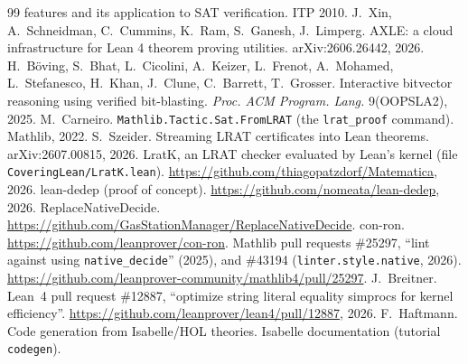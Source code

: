\documentclass[11pt]{article}
\begin{document}
\begin{thebibliography}{99}
  features and its application to SAT verification. ITP 2010.
 J.~Xin, A.~Schneidman, C.~Cummins, K.~Ram, S.~Ganesh, J.~Limperg. AXLE: a cloud
  infrastructure for Lean 4 theorem proving utilities. arXiv:2606.26442, 2026.
 H.~B\"oving, S.~Bhat, L.~Cicolini, A.~Keizer, L.~Frenot, A.~Mohamed,
  L.~Stefanesco, H.~Khan, J.~Clune, C.~Barrett, T.~Grosser. Interactive bitvector reasoning using
  verified bit-blasting. \emph{Proc. ACM Program. Lang.} 9(OOPSLA2), 2025.
 M.~Carneiro. \texttt{Mathlib.Tactic.Sat.FromLRAT} (the \texttt{lrat\_proof}
  command). Mathlib, 2022.
 S.~Szeider. Streaming LRAT certificates into Lean theorems. arXiv:2607.00815,
  2026.
 LratK, an LRAT checker evaluated by Lean's kernel (file \texttt{CoveringLean/LratK.lean}).
  \url{https://github.com/thiagopatzdorf/Matematica}, 2026.
 lean-dedep (proof of concept). \url{https://github.com/nomeata/lean-dedep}, 2026.
 ReplaceNativeDecide. \url{https://github.com/GasStationManager/ReplaceNativeDecide}.
 con-ron. \url{https://github.com/leanprover/con-ron}.
 Mathlib pull requests \#25297, ``lint against using \texttt{native\_decide}''
  (2025), and \#43194 (\texttt{linter.style.native}, 2026).
  \url{https://github.com/leanprover-community/mathlib4/pull/25297}.
 J.~Breitner. Lean~4 pull request \#12887, ``optimize string literal equality
  simprocs for kernel efficiency''. \url{https://github.com/leanprover/lean4/pull/12887}, 2026.
 F.~Haftmann. Code generation from Isabelle/HOL theories. Isabelle documentation
  (tutorial \texttt{codegen}).
\end{thebibliography}
\end{document}
